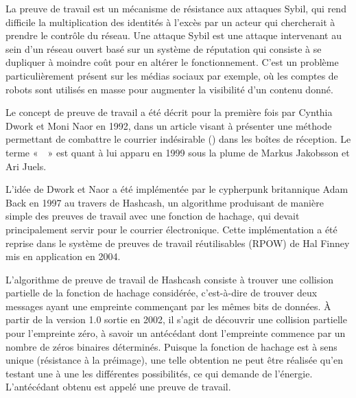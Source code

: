 La preuve de travail est un mécanisme de résistance aux attaques Sybil, qui rend difficile la multiplication des identités à l'excès par un acteur qui chercherait à prendre le contrôle du réseau. Une attaque Sybil est une attaque intervenant au sein d'un réseau ouvert basé sur un système de réputation qui consiste à se dupliquer à moindre coût pour en altérer le fonctionnement. C'est un problème particulièrement présent sur les médias sociaux par exemple, où les comptes de robots sont utilisés en masse pour augmenter la visibilité d'un contenu donné. %

Le concept de preuve de travail a été décrit pour la première fois par Cynthia Dwork et Moni Naor en 1992, dans un article visant à présenter une méthode permettant de combattre le courrier indésirable () dans les boîtes de réception. Le terme «~~» est quant à lui apparu en 1999 sous la plume de Markus Jakobsson et Ari Juels.

L'idée de Dwork et Naor a été implémentée par le cypherpunk britannique Adam Back en 1997 au travers de Hashcash, un algorithme produisant de manière simple des preuves de travail avec une fonction de hachage, qui devait principalement servir pour le courrier électronique. Cette implémentation a été reprise dans le système de preuves de travail réutilisables (RPOW) de Hal Finney mis en application en 2004. %


L'algorithme de preuve de travail de Hashcash consiste à trouver une collision partielle de la fonction de hachage considérée, c'est-à-dire de trouver deux messages ayant une empreinte commençant par les mêmes bits de données. À partir de la version 1.0 sortie en 2002, il s'agit de découvrir une collision partielle pour l'empreinte zéro, à savoir un antécédant dont l'empreinte commence par un nombre de zéros binaires déterminés. Puisque la fonction de hachage est à sens unique (résistance à la préimage), une telle obtention ne peut être réalisée qu'en testant une à une les différentes possibilités, ce qui demande de l'énergie. L'antécédant obtenu est appelé une preuve de travail.

